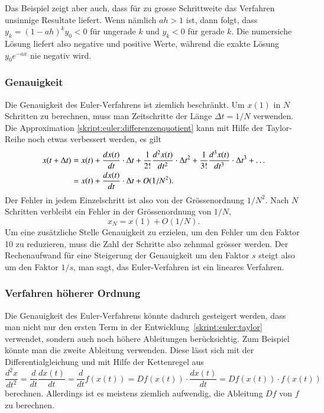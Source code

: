 Das Beispiel zeigt aber auch, dass für zu grosse Schrittweite das
Verfahren unsinnige Resultate liefert.
Wenn nämlich $ah>1$ ist, dann folgt, dass
$y_k=(1-ah)^k y_0  <0$ für ungerade $k$ und $y_k < 0$ für gerade $k$.
Die numersiche Lösung liefert also negative und positive Werte,
während die exakte Lösung $y_0e^{-ax}$ nie negativ wird.

\subsubsection{Genauigkeit}
Die Genauigkeit des Euler-Verfahrens ist ziemlich beschränkt.
Um $x(1)$ in $N$ Schritten zu berechnen, muss man Zeitschritte der
Länge $\Delta t=1/N$ verwenden.
Die Approximation \eqref{skript:euler:differenzenquotient} kann mit
Hilfe der Taylor-Reihe noch etwas verbessert werden, es gilt
\begin{align}
x(t+\Delta t)
&=
x(t) + \frac{d x(t) }{dt}\cdot \Delta t
+ \frac{1}{2!}\frac{d^2x(t)}{dt^2}\cdot \Delta t^2
+ \frac{1}{3!}\frac{d^3x(t)}{dt^3}\cdot \Delta t^3
+\dots
\label{skript:euler:taylor}
\\
&=
x(t) + \frac{d x(t) }{dt}\cdot \Delta t
+ O(1/N^2).
\notag
\end{align}
Der Fehler in jedem Einzelschritt ist also von der Grössenordnung $1/N^2$.
Nach $N$ Schritten verbleibt ein Fehler in der Grössenordnung von $1/N$,
\[
x_N = x(1) + O(1/N).
\]
Um eine zusätzliche Stelle Genauigkeit zu erzielen, um den Fehler um
den Faktor 10 zu reduzieren, muss die Zahl der Schritte also zehnmal 
grösser werden.
Der Rechenaufwand für eine Steigerung der Genauigkeit um den Faktor
$s$ steigt also um den Faktor $1/s$, man sagt, das Euler-Verfahren ist
ein lineares Verfahren.

\subsubsection{Verfahren höherer Ordnung}
Die Genauigkeit des Euler-Verfahrens könnte dadurch gesteigert
werden, dass man nicht nur den ersten Term in der
Entwicklung~\eqref{skript:euler:taylor} verwendet, sondern auch
noch höhere Ableitungen berücksichtig.
Zum Beispiel könnte man die zweite Ableitung verwenden.
Diese lässt sich mit der Differentialgleichung und mit Hilfe der Kettenregel
aus
\[
\frac{d^2x}{dt^2}
=
\frac{d}{dt} \frac{dx(t)}{dt}
=
\frac{d}{dt} f(x(t))
=
Df(x(t))\cdot \frac{dx(t)}{dt}
=
Df(x(t))\cdot f(x(t))
\]
berechnen.
Allerdings ist es meistens ziemlich aufwendig, die Ableitung $Df$ von $f$ zu
berechnen.

